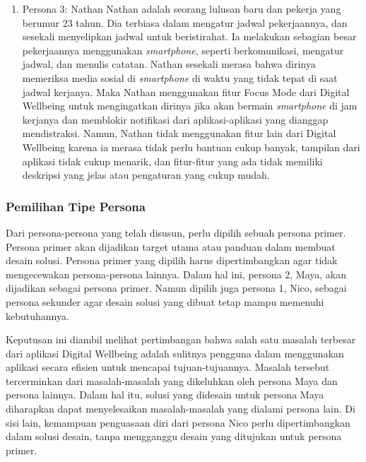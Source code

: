 \begin{enumerate}
  \item Persona 3: Nathan
  \subitem Nathan adalah seorang lulusan baru dan pekerja yang berumur 23 tahun. Dia terbiasa dalam mengatur jadwal pekerjaannya, dan sesekali menyelipkan jadwal untuk beristirahat. Ia melakukan sebagian besar pekerjaannya menggunakan \textit{smartphone}, seperti berkomunikasi, mengatur jadwal, dan menulis catatan. Nathan sesekali merasa bahwa dirinya memeriksa media sosial di \textit{smartphone} di waktu yang tidak tepat di saat jadwal kerjanya. Maka Nathan menggunakan fitur Focus Mode dari Digital Wellbeing untuk mengingatkan dirinya jika akan bermain \textit{smartphone} di jam kerjanya dan memblokir notifikasi dari aplikasi-aplikasi yang dianggap mendistraksi. Namun, Nathan tidak menggunakan fitur lain dari Digital Wellbeing karena ia merasa tidak perlu bantuan cukup banyak, tampilan dari aplikasi tidak cukup menarik, dan fitur-fitur yang ada tidak memiliki deskripsi yang jelas atau pengaturan yang cukup mudah.

\end{enumerate}

\subsubsection{Pemilihan Tipe Persona}
Dari persona-persona yang telah disusun, perlu dipilih sebuah persona primer. Persona primer akan dijadikan target utama atau panduan dalam membuat desain solusi. Persona primer yang dipilih harus dipertimbangkan agar tidak mengecewakan persona-persona lainnya. Dalam hal ini, persona 2, Maya, akan dijadikan sebagai persona primer. Namun dipilih juga persona 1, Nico, sebagai persona sekunder agar desain solusi yang dibuat tetap mampu memenuhi kebutuhannya.

Keputusan ini diambil melihat pertimbangan bahwa salah satu masalah terbesar dari aplikasi Digital Wellbeing adalah sulitnya pengguna dalam menggunakan aplikasi secara efisien untuk mencapai tujuan-tujuannya. Masalah tersebut tercerminkan dari masalah-masalah yang dikeluhkan oleh persona Maya dan persona lainnya. Dalam hal itu, solusi yang didesain untuk persona Maya diharapkan dapat menyelesaikan masalah-masalah yang dialami persona lain. Di sisi lain, kemampuan penguasaan diri dari persona Nico perlu dipertimbangkan dalam solusi desain, tanpa mengganggu desain yang ditujukan untuk persona primer.



